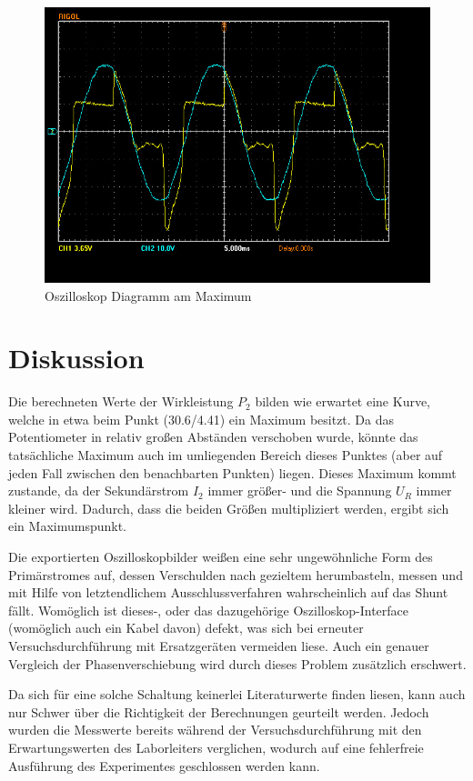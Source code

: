 \documentclass[12pt,a4paper,twoside]{article}
\begin{document}
\begin{figure}[H]
    \centering
    \includegraphics[width=0.6\linewidth, angle=0]{nudes/A3 Oszi Pmax.jpg}
    \caption{Oszilloskop Diagramm am Maximum}
    \label{fig:OszilloskopDiagrammMax}
\end{figure}



\section{Diskussion} %

Die berechneten Werte der Wirkleistung $P_{2}$ bilden wie erwartet eine Kurve, welche in etwa beim Punkt (30.6/4.41) ein Maximum besitzt. Da das Potentiometer in relativ großen Abständen verschoben wurde, könnte das tatsächliche Maximum auch im umliegenden Bereich dieses Punktes (aber auf jeden Fall zwischen den benachbarten Punkten) liegen.
Dieses Maximum kommt zustande, da der Sekundärstrom $I_{2}$ immer größer- und die Spannung $U_{R}$ immer kleiner wird. Dadurch, dass die beiden Größen multipliziert werden, ergibt sich ein Maximumspunkt. \newline

\noindent
Die exportierten Oszilloskopbilder weißen eine sehr ungewöhnliche Form des Primärstromes auf, dessen Verschulden nach gezieltem herumbasteln, messen und mit Hilfe von letztendlichem Ausschlussverfahren wahrscheinlich auf das Shunt fällt. Womöglich ist dieses-, oder das dazugehörige Oszilloskop-Interface (womöglich auch ein Kabel davon) defekt, was sich bei erneuter Versuchsdurchführung mit Ersatzgeräten vermeiden liese. Auch ein genauer Vergleich der Phasenverschiebung wird durch dieses Problem zusätzlich erschwert. \newline

\noindent
Da sich für eine solche Schaltung keinerlei Literaturwerte finden liesen, kann auch nur Schwer über die Richtigkeit der Berechnungen geurteilt werden. Jedoch wurden die Messwerte bereits während der Versuchsdurchführung mit den Erwartungswerten des Laborleiters verglichen, wodurch auf eine fehlerfreie Ausführung des Experimentes geschlossen werden kann.
\end{document}
